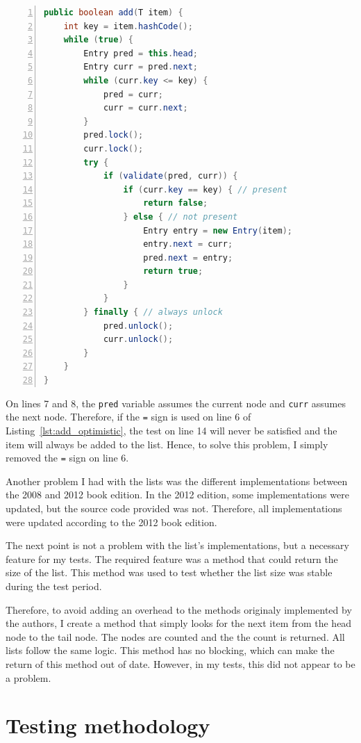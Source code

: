 \documentclass{article}
\begin{document}
\begin{lstlisting}[language=Java, numbers=left, captionpos=b, basicstyle=\ttfamily\footnotesize, caption=Method add of OptimisticList.java, label=lst:add_optimistic]
public boolean add(T item) {
    int key = item.hashCode();
    while (true) {
        Entry pred = this.head;
        Entry curr = pred.next;
        while (curr.key <= key) {
            pred = curr;
            curr = curr.next;
        }
        pred.lock();
        curr.lock();
        try {
            if (validate(pred, curr)) {
                if (curr.key == key) { // present
                    return false;
                } else { // not present
                    Entry entry = new Entry(item);
                    entry.next = curr;
                    pred.next = entry;
                    return true;
                }
            }
        } finally { // always unlock
            pred.unlock();
            curr.unlock();
        }
    }
}
\end{lstlisting}

On lines 7 and 8, the \texttt{pred} variable assumes the current node and \texttt{curr} assumes the next node. Therefore, if the \texttt{=} sign is used on line 6 of Listing~\ref{lst:add_optimistic}, the test on line 14 will never be satisfied and the item will always be added to the list. Hence, to solve this problem, I simply removed the \texttt{=} sign on line 6.

Another problem I had with the lists was the different implementations between the 2008 and 2012 book edition. In the 2012 edition, some implementations were updated, but the source code provided was not. Therefore, all implementations were updated according to the 2012 book edition.

The next point is not a problem with the list's implementations, but a necessary feature for my tests. The required feature was a method that could return the size of the list. This method was used to test whether the list size was stable during the test period.

Therefore, to avoid adding an overhead to the methods originaly implemented by the authors, I create a method that simply looks for the next item from the head node to the tail node. The nodes are counted and the the count is returned. All lists follow the same logic. This method has no blocking, which can make the return of this method out of date. However, in my tests, this did not appear to be a problem.


\section{Testing methodology} \label{section:methodology}
\end{document}
